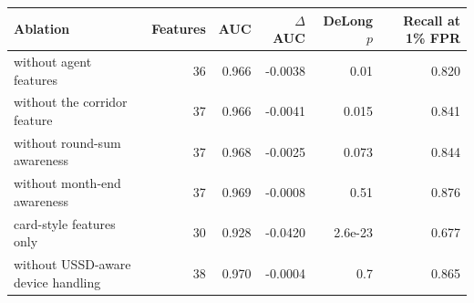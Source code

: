\begin{tabular}{lrrrrr}
\toprule
Ablation & Features & AUC & $\Delta$AUC & DeLong $p$ & Recall at 1\% FPR \\
\midrule
without agent features & 36 & 0.966 & -0.0038 & 0.01 & 0.820 \\
without the corridor feature & 37 & 0.966 & -0.0041 & 0.015 & 0.841 \\
without round-sum awareness & 37 & 0.968 & -0.0025 & 0.073 & 0.844 \\
without month-end awareness & 37 & 0.969 & -0.0008 & 0.51 & 0.876 \\
card-style features only & 30 & 0.928 & -0.0420 & 2.6e-23 & 0.677 \\
without USSD-aware device handling & 38 & 0.970 & -0.0004 & 0.7 & 0.865 \\
\bottomrule
\end{tabular}
